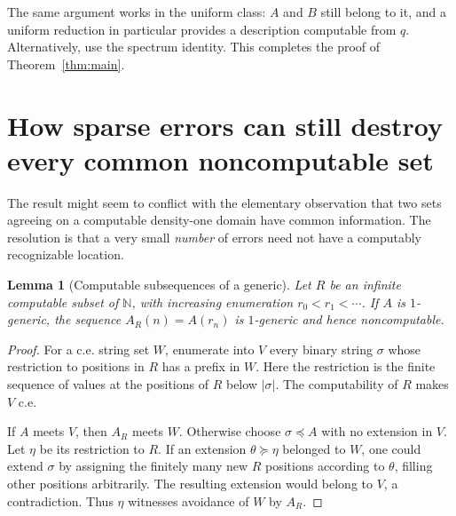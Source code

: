 \documentclass[11pt,a4paper]{article}
\newcommand{\N}{\mathbb N}
\newcommand{\pref}{\preccurlyeq}
\newtheorem{lemma}[theorem]{Lemma}
\theoremstyle{definition}
\theoremstyle{remark}
\begin{document}
The same argument works in the uniform class: $A$ and $B$ still belong to it, and a uniform reduction in particular provides a description computable from $q$. Alternatively, use the spectrum identity. This completes the proof of Theorem~\ref{thm:main}.

\section{How sparse errors can still destroy every common noncomputable set}\label{sec:support}
The result might seem to conflict with the elementary observation that two sets agreeing on a computable density-one domain have common information. The resolution is that a very small \emph{number} of errors need not have a computably recognizable location.

\begin{lemma}[Computable subsequences of a generic]\label{lem:subsequence}
Let $R$ be an infinite computable subset of $\N$, with increasing enumeration $r_0<r_1<\cdots$. If $A$ is $1$-generic, the sequence $A_R(n)=A(r_n)$ is $1$-generic and hence noncomputable.
\end{lemma}
\begin{proof}
For a c.e. string set $W$, enumerate into $V$ every binary string $\sigma$ whose restriction to positions in $R$ has a prefix in $W$. Here the restriction is the finite sequence of values at the positions of $R$ below $|\sigma|$. The computability of $R$ makes $V$ c.e.

If $A$ meets $V$, then $A_R$ meets $W$. Otherwise choose $\sigma\pref A$ with no extension in $V$. Let $\eta$ be its restriction to $R$. If an extension $\theta\succeq\eta$ belonged to $W$, one could extend $\sigma$ by assigning the finitely many new $R$ positions according to $\theta$, filling other positions arbitrarily. The resulting extension would belong to $V$, a contradiction. Thus $\eta$ witnesses avoidance of $W$ by $A_R$.
\end{proof}
\end{document}

